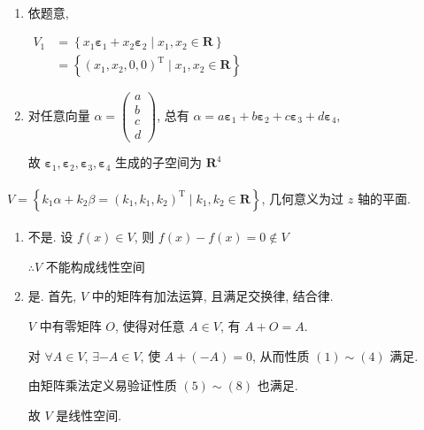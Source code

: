 	 \paragraph{} %
		 \begin{enumerate}
			 \item %
			       依题意,

			       \( \begin{aligned}
				       V_{1} & = \left\{ x_{1}\boldsymbol{\varepsilon}_{1} + x_{2}\boldsymbol{\varepsilon}_{2} \mid x_{1}, x_{2} \in \mathbf{R} \right\} \\
				             & = \left\{ (x_{1}, x_{2}, 0, 0)^{\mathrm{T}} \mid x_{1}, x_{2} \in \mathbf{R} \right\}
			       \end{aligned} \)
			 \item %
			       对任意向量 \( \alpha =
			       \begin{pmatrix}
				       a \\
				       b \\
				       c \\
				       d\end{pmatrix} \), 总有 \( \alpha = a\boldsymbol{\varepsilon}_{1} + b\boldsymbol{\varepsilon}_{2} + c\boldsymbol{\varepsilon}_{3} + d\boldsymbol{\varepsilon}_{4} \),

			       故 \( \boldsymbol{\varepsilon}_{1}, \boldsymbol{\varepsilon}_{2}, \boldsymbol{\varepsilon}_{3}, \boldsymbol{\varepsilon}_{4} \) 生成的子空间为 \(\mathbf{R}^{4}\)
		 \end{enumerate}


	 \paragraph{} %
		 \( V = \left\{ k_{1}\alpha + k_{2}\beta = (k_{1}, k_{1}, k_{2})^{\mathrm{T}} \mid k_{1}, k_{2} \in \mathbf{R} \right\} \), 几何意义为过 \( z \) 轴的平面.


	 \paragraph{} %
		 \begin{enumerate}
			 \item %
			       不是. 设 $f(x) \in V$, 则 $f(x) - f(x) = 0 \notin V$

			       $\therefore V$ 不能构成线性空间
			 \item %
			       是. 首先, $V$ 中的矩阵有加法运算, 且满足交换律, 结合律.

			       $V$ 中有零矩阵 $O$, 使得对任意 $A \in V$, 有 $A + O = A$.

			       对 $\forall A \in V$, $\exists -A \in V$, 使 $A + (-A) = 0$, 从而性质 \((1)\sim (4)\) 满足.

			       由矩阵乘法定义易验证性质 \((5)\sim (8)\) 也满足.

			       故 $V$ 是线性空间.
		 \end{enumerate}


